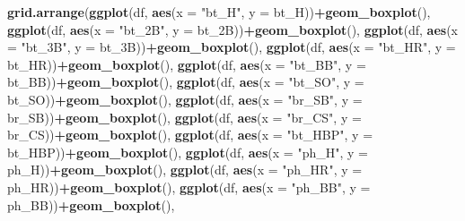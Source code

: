 \documentclass[]{article}
\newenvironment{Shaded}{\begin{snugshade}}{\end{snugshade}}
\newcommand{\DataTypeTok}[1]{\textcolor[rgb]{0.13,0.29,0.53}{#1}}
\newcommand{\KeywordTok}[1]{\textcolor[rgb]{0.13,0.29,0.53}{\textbf{#1}}}
\newcommand{\NormalTok}[1]{#1}
\newcommand{\OperatorTok}[1]{\textcolor[rgb]{0.81,0.36,0.00}{\textbf{#1}}}
\newcommand{\StringTok}[1]{\textcolor[rgb]{0.31,0.60,0.02}{#1}}
\begin{document}
\begin{Shaded}
\begin{Highlighting}[]
\KeywordTok{grid.arrange}\NormalTok{(}\KeywordTok{ggplot}\NormalTok{(df, }\KeywordTok{aes}\NormalTok{(}\DataTypeTok{x =} \StringTok{"bt_H"}\NormalTok{, }\DataTypeTok{y =}\NormalTok{ bt_H))}\OperatorTok{+}\KeywordTok{geom_boxplot}\NormalTok{(),}
             \KeywordTok{ggplot}\NormalTok{(df, }\KeywordTok{aes}\NormalTok{(}\DataTypeTok{x =} \StringTok{"bt_2B"}\NormalTok{, }\DataTypeTok{y =}\NormalTok{ bt_2B))}\OperatorTok{+}\KeywordTok{geom_boxplot}\NormalTok{(),}
             \KeywordTok{ggplot}\NormalTok{(df, }\KeywordTok{aes}\NormalTok{(}\DataTypeTok{x =} \StringTok{"bt_3B"}\NormalTok{, }\DataTypeTok{y =}\NormalTok{ bt_3B))}\OperatorTok{+}\KeywordTok{geom_boxplot}\NormalTok{(),}
             \KeywordTok{ggplot}\NormalTok{(df, }\KeywordTok{aes}\NormalTok{(}\DataTypeTok{x =} \StringTok{"bt_HR"}\NormalTok{, }\DataTypeTok{y =}\NormalTok{ bt_HR))}\OperatorTok{+}\KeywordTok{geom_boxplot}\NormalTok{(),}
             \KeywordTok{ggplot}\NormalTok{(df, }\KeywordTok{aes}\NormalTok{(}\DataTypeTok{x =} \StringTok{"bt_BB"}\NormalTok{, }\DataTypeTok{y =}\NormalTok{ bt_BB))}\OperatorTok{+}\KeywordTok{geom_boxplot}\NormalTok{(),}
             \KeywordTok{ggplot}\NormalTok{(df, }\KeywordTok{aes}\NormalTok{(}\DataTypeTok{x =} \StringTok{"bt_SO"}\NormalTok{, }\DataTypeTok{y =}\NormalTok{ bt_SO))}\OperatorTok{+}\KeywordTok{geom_boxplot}\NormalTok{(),}
             \KeywordTok{ggplot}\NormalTok{(df, }\KeywordTok{aes}\NormalTok{(}\DataTypeTok{x =} \StringTok{"br_SB"}\NormalTok{, }\DataTypeTok{y =}\NormalTok{ br_SB))}\OperatorTok{+}\KeywordTok{geom_boxplot}\NormalTok{(),}
             \KeywordTok{ggplot}\NormalTok{(df, }\KeywordTok{aes}\NormalTok{(}\DataTypeTok{x =} \StringTok{"br_CS"}\NormalTok{, }\DataTypeTok{y =}\NormalTok{ br_CS))}\OperatorTok{+}\KeywordTok{geom_boxplot}\NormalTok{(),}
             \KeywordTok{ggplot}\NormalTok{(df, }\KeywordTok{aes}\NormalTok{(}\DataTypeTok{x =} \StringTok{"bt_HBP"}\NormalTok{, }\DataTypeTok{y =}\NormalTok{ bt_HBP))}\OperatorTok{+}\KeywordTok{geom_boxplot}\NormalTok{(),}
             \KeywordTok{ggplot}\NormalTok{(df, }\KeywordTok{aes}\NormalTok{(}\DataTypeTok{x =} \StringTok{"ph_H"}\NormalTok{, }\DataTypeTok{y =}\NormalTok{ ph_H))}\OperatorTok{+}\KeywordTok{geom_boxplot}\NormalTok{(),}
             \KeywordTok{ggplot}\NormalTok{(df, }\KeywordTok{aes}\NormalTok{(}\DataTypeTok{x =} \StringTok{"ph_HR"}\NormalTok{, }\DataTypeTok{y =}\NormalTok{ ph_HR))}\OperatorTok{+}\KeywordTok{geom_boxplot}\NormalTok{(),}
             \KeywordTok{ggplot}\NormalTok{(df, }\KeywordTok{aes}\NormalTok{(}\DataTypeTok{x =} \StringTok{"ph_BB"}\NormalTok{, }\DataTypeTok{y =}\NormalTok{ ph_BB))}\OperatorTok{+}\KeywordTok{geom_boxplot}\NormalTok{(),}

\end{Highlighting}
\end{Shaded}
\end{document}

